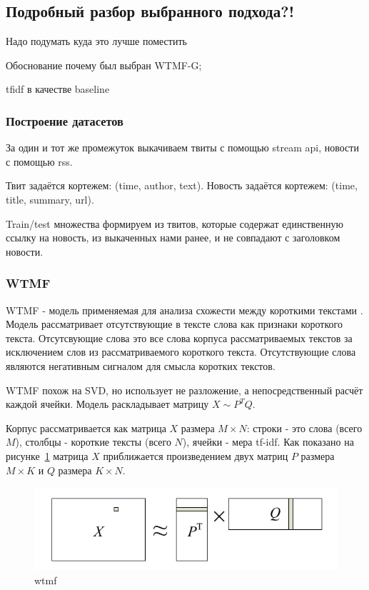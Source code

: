 \subsection{Подробный разбор выбранного подхода?!}
    Надо подумать куда это лучше поместить

        Обоснование почему был выбран WTMF-G;

        tfidf в качестве baseline

    \subsubsection{Построение датасетов}
        За один и тот же промежуток выкачиваем твиты с помощью stream api, новости с помощью rss.

        Твит задаётся кортежем: (time, author, text). Новость задаётся кортежем: (time, title, summary, url).

        Train/test множества формируем из твитов, которые содержат единственную ссылку на новость, из выкаченных нами ранее, и не совпадают с заголовком новости.

    \subsubsection{WTMF}
        WTMF - модель применяемая для анализа схожести между короткими текстами \cite{wtmf}. Модель рассматривает отсутствующие в тексте слова как признаки короткого текста. Отсутсвующие слова это все слова корпуса рассматриваемых текстов за исключением слов из рассматриваемого короткого текста. Отсутствующие слова являются негативным сигналом для смысла коротких текстов.

        WTMF похож на SVD, но использует не разложение, а непосредственный расчёт каждой ячейки. Модель раскладывает матрицу $X \sim P^TQ$.

        Корпус рассматривается как матрица $X$ размера $M \times N$: строки - это слова (всего $M$), столбцы - короткие тексты (всего $N$), ячейки - мера tf-idf.
        Как показано на рисунке~\ref{pic:wtmf} матрица $X$ приближается произведением двух матриц $P$ размера $M \times K$ и $Q$ размера $K \times N$.

        \begin{figure}[h!]
            \center
            \includegraphics[scale=0.45]{wtmf.png}
            \caption{wtmf}
            \label{pic:wtmf}
        \end{figure}

